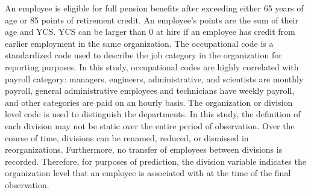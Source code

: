 \documentclass[12pt,letterpaper]{article}
\begin{document}
An employee is eligible for full pension benefits after exceeding either 65 years of age or 85 points of retirement credit. An employee's points are the sum of their age and YCS.  YCS can be larger than 0 at hire if an employee has credit from earlier employment in the same organization. %
The occupational code is a standardized code used to describe the job category in the organization for reporting purposes. In this study, occupational codes are highly correlated with payroll category: managers, engineers, administrative, and scientists are monthly payroll, general administrative employees and technicians have weekly payroll, and other categories are paid on an hourly basis. The organization or division level code is used to distinguish the departments.  In this study, the definition of each division may not be static over the entire period of observation.  Over the course of time, divisions can be renamed, reduced, or dismissed in reorganizations. Furthermore, no transfer of employees between divisions is recorded.  Therefore, for purposes of prediction, the division variable indicates the organization level that an employee is associated with at the time of the final observation.


\end{document}
